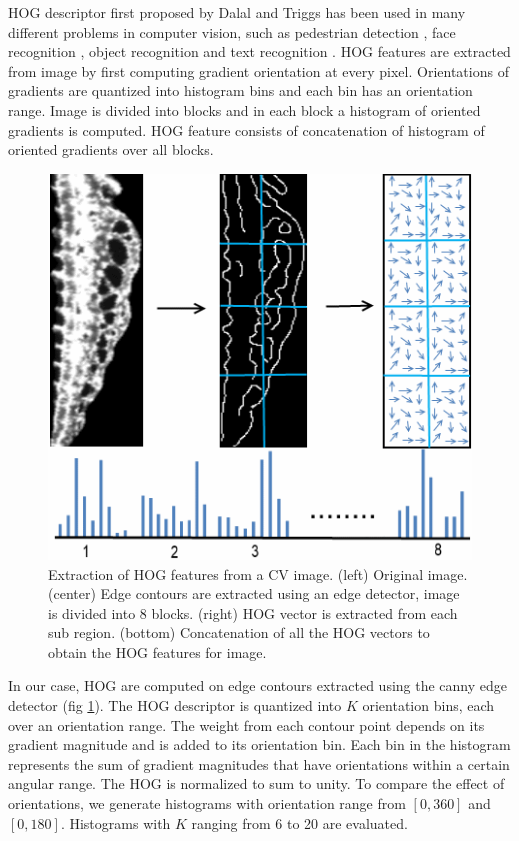 HOG descriptor first proposed by Dalal and Triggs \cite{Dalal05} has been used in many different problems in computer vision, such as pedestrian detection \cite{Wada09}, face recognition \cite{Deniz11}, object recognition \cite{Bosch07} and text recognition \cite{Wang10}. HOG features are extracted from image by first computing gradient orientation at every pixel. Orientations of gradients are quantized into histogram bins and each bin has an orientation range. Image is divided into blocks and in each block a histogram of oriented gradients is computed. HOG feature consists of concatenation of histogram of oriented gradients over all blocks. 
\begin{figure}[htb] 
 \centering
\includegraphics[scale=0.3]{figure/hog.png}
  \caption{ Extraction of HOG features from a CV image. (left) Original image. (center) Edge contours are extracted using an edge detector, image is divided into 8 blocks. (right) HOG vector is extracted from each sub region. (bottom) Concatenation of all the HOG vectors to obtain the HOG features for image.}
 \label{hog}
\end{figure}
In our case, HOG are computed on edge contours extracted using the canny edge detector (fig \ref{hog}). The HOG descriptor is quantized into $K$ orientation bins, each over an orientation range. The weight from each contour point depends on its gradient magnitude and is added to its orientation bin. Each bin in the histogram represents the sum of gradient magnitudes that have orientations within a certain angular range. The HOG is normalized to sum to unity. To compare the effect of orientations, we generate histograms with orientation range from $[0, 360]$ and $[0, 180]$. Histograms with $K$ ranging from 6 to 20 are evaluated. 

